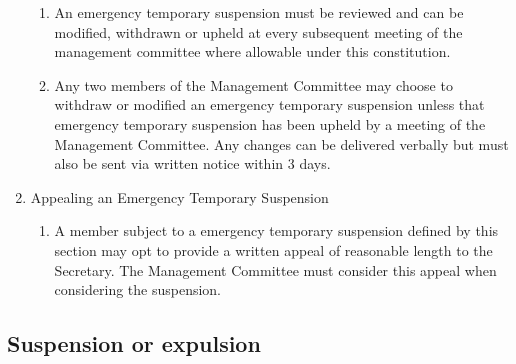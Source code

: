\documentclass[../constitution.tex]{subfiles}
\begin{document}
\begin{enumerate}
  \begin{enumerate}
  
  \item An emergency temporary suspension must be reviewed and can be modified, withdrawn or upheld at every subsequent meeting of the management committee where allowable under this constitution.
  \item Any two members of the Management Committee may choose to withdraw or modified an emergency temporary suspension unless that emergency temporary suspension has been upheld by a meeting of the Management Committee. Any changes can be delivered verbally but must also be sent via written notice within 3 days.\\
  \end{enumerate}
\item Appealing an Emergency Temporary Suspension

  \begin{enumerate}
  
  \item A member subject to a emergency temporary suspension defined by this section may opt to provide a written appeal of reasonable length to the Secretary. The Management Committee must consider this appeal when considering the suspension.
  \end{enumerate}
\end{enumerate}

\hypertarget{suspension-or-expulsion}{%
\subsection{Suspension or expulsion}\label{suspension-or-expulsion}}
\end{document}
